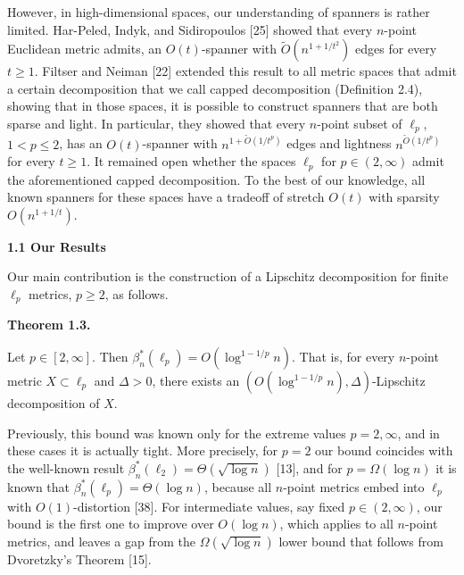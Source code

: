 \documentclass[10pt,a4paper]{amsart}
\begin{document}
\par
\par
However, in high-dimensional spaces, our understanding of spanners is rather limited. Har-Peled, Indyk, and Sidiropoulos [25] showed that every $n$-point Euclidean metric admits, an $O(t)$-spanner with $\tilde{O}(n^{1+1/t^{2}})$ edges for every $t\geq 1$. Filtser and Neiman [22] extended this result to all metric spaces that admit a certain decomposition that we call capped decomposition (Definition 2.4), showing that in those spaces, it is possible to construct spanners that are both sparse and light. In particular, they showed that every $n$-point subset of $\ell_{p}$, $1<p\leq 2$, has an $O(t)$-spanner with $n^{1+\tilde{O}(1/t^{p})}$ edges and lightness $n^{\tilde{O}(1/t^{p})}$ for every $t\geq 1$. It remained open whether the spaces $\ell_{p}$ for $p\in(2,\infty)$ admit the aforementioned capped decomposition. To the best of our knowledge, all known spanners for these spaces have a tradeoff of stretch $O(t)$ with sparsity $O(n^{1+1/t})$.
\par
\par
\par
\par\medskip\noindent\textbf{1.1 Our Results}\par
Our main contribution is the construction of a Lipschitz decomposition for finite $\ell_{p}$ metrics, $p\geq 2$, as follows.
\par
\par
\par\medskip\noindent\textbf{Theorem 1.3.}\par
Let $p\in[2,\infty]$. Then $\beta^{*}_{n}(\ell_{p})=O(\log^{1-1/p}{n})$. That is, for every $n$-point metric $X\subset\ell_{p}$ and $\Delta>0$, there exists an $(O(\log^{1-1/p}{n}),\Delta)$-Lipschitz decomposition of $X$.
\par
\par
\par
Previously, this bound was known only for the extreme values $p=2,\infty$, and in these cases it is actually tight. More precisely, for $p=2$ our bound coincides with the well-known result $\beta^{*}_{n}(\ell_{2})=\Theta(\sqrt{\log{n}})$ [13], and for $p=\Omega(\log{n})$ it is known that $\beta^{*}_{n}(\ell_{p})=\Theta(\log{n})$, because all $n$-point metrics embed into $\ell_{p}$ with $O(1)$-distortion [38]. For intermediate values, say fixed $p\in(2,\infty)$, our bound is the first one to improve over $O(\log n)$, which applies to all $n$-point metrics, and leaves a gap from the $\Omega(\sqrt{\log{n}})$ lower bound that follows from Dvoretzky’s Theorem [15].
\end{document}
